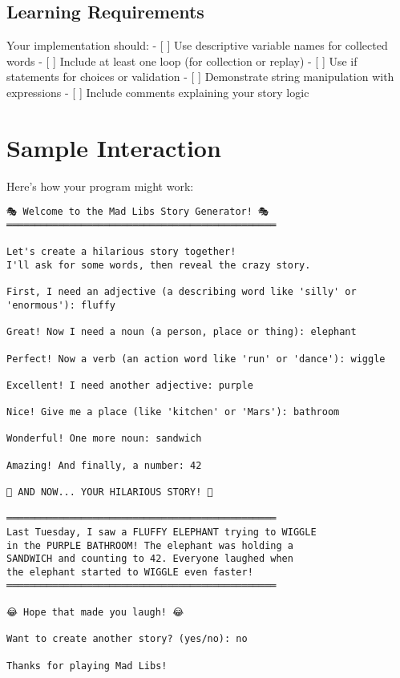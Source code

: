 \documentclass[
  letterpaper,
  DIV=11,
  numbers=noendperiod,
  oneside]{scrreprt}
\begin{document}
\subsection{Learning Requirements}\label{learning-requirements-1}

Your implementation should: - {[} {]} Use descriptive variable names for
collected words - {[} {]} Include at least one loop (for collection or
replay) - {[} {]} Use if statements for choices or validation - {[} {]}
Demonstrate string manipulation with expressions - {[} {]} Include
comments explaining your story logic

\section{Sample Interaction}\label{sample-interaction-1}

Here's how your program might work:

\begin{verbatim}
🎭 Welcome to the Mad Libs Story Generator! 🎭
═══════════════════════════════════════════════

Let's create a hilarious story together!
I'll ask for some words, then reveal the crazy story.

First, I need an adjective (a describing word like 'silly' or 'enormous'): fluffy

Great! Now I need a noun (a person, place or thing): elephant

Perfect! Now a verb (an action word like 'run' or 'dance'): wiggle

Excellent! I need another adjective: purple

Nice! Give me a place (like 'kitchen' or 'Mars'): bathroom

Wonderful! One more noun: sandwich

Amazing! And finally, a number: 42

🎪 AND NOW... YOUR HILARIOUS STORY! 🎪

═══════════════════════════════════════════════
Last Tuesday, I saw a FLUFFY ELEPHANT trying to WIGGLE 
in the PURPLE BATHROOM! The elephant was holding a 
SANDWICH and counting to 42. Everyone laughed when 
the elephant started to WIGGLE even faster!
═══════════════════════════════════════════════

😂 Hope that made you laugh! 😂

Want to create another story? (yes/no): no

Thanks for playing Mad Libs!
\end{verbatim}
\end{document}
